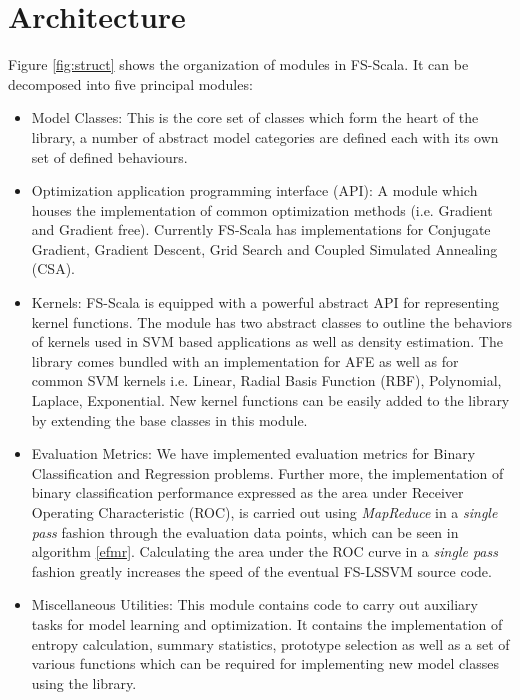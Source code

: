 \chapter{Architecture}
\label{cha:2}

Figure \ref{fig:struct} shows the organization of modules in FS-Scala. It can be decomposed into five principal modules:
\begin{itemize}
\item Model Classes:
This is the core set of classes which form the heart of the library, a number of abstract model categories are defined each with its own set of defined behaviours. 
\item Optimization application programming interface (API):
A module which houses the implementation of common optimization methods (i.e. Gradient and Gradient free). Currently FS-Scala has implementations for Conjugate Gradient, Gradient Descent, Grid Search and Coupled Simulated Annealing \cite{Xavier-De-Souza2010} (CSA). 
\item Kernels:
FS-Scala is equipped with a powerful abstract API for representing kernel functions. The module has two abstract classes to outline the behaviors of kernels used in SVM based applications as well as density estimation. The library comes bundled with an implementation for AFE as well as for common SVM kernels i.e. Linear, Radial Basis Function (RBF), Polynomial, Laplace, Exponential. New kernel functions can be easily added to the library by extending the base classes in this module.
\item Evaluation Metrics:
We have implemented evaluation metrics for Binary Classification and Regression problems. Further more, the implementation of binary classification performance expressed as the area under Receiver Operating Characteristic (ROC), is carried out using \textit{MapReduce} in a \textit{single pass} fashion through the evaluation data points, which can be seen in algorithm \ref{efmr}. Calculating the area under the ROC curve in a \textit{single pass} fashion greatly increases the speed of the eventual FS-LSSVM source code.
\item Miscellaneous Utilities:
This module contains code to carry out auxiliary tasks for model learning and optimization. It contains the implementation of entropy calculation, summary statistics, prototype selection as well as a set of various functions which can be required for implementing new model classes using the library.  

\end{itemize}

